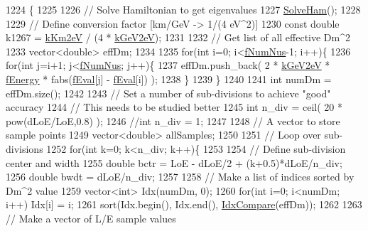 \begin{DoxyCode}
1224 \{
1225 
1226   \textcolor{comment}{// Solve Hamiltonian to get eigenvalues}
1227   \hyperlink{classOscProb_1_1PMNS__Base_a91f065cb9e910e0095e41462b4420b01}{SolveHam}();
1228 
1229   \textcolor{comment}{// Define conversion factor [km/GeV -> 1/(4 eV^2)]}
1230   \textcolor{keyword}{const} \textcolor{keywordtype}{double} k1267 = \hyperlink{classOscProb_1_1PMNS__Base_a382ddd7b76ca89b43f22614a2ea7327b}{kKm2eV} / (4 * \hyperlink{classOscProb_1_1PMNS__Base_ad36a0a6bf58d6ec093d3947784bd89e9}{kGeV2eV});
1231 
1232   \textcolor{comment}{// Get list of all effective Dm^2}
1233   vector<double> effDm;
1234 
1235   \textcolor{keywordflow}{for}(\textcolor{keywordtype}{int} i=0; i<\hyperlink{classOscProb_1_1PMNS__Base_a24bb74bed63569dfe88b18fa6a08060e}{fNumNus}-1; i++)\{
1236     \textcolor{keywordflow}{for}(\textcolor{keywordtype}{int} j=i+1; j<\hyperlink{classOscProb_1_1PMNS__Base_a24bb74bed63569dfe88b18fa6a08060e}{fNumNus}; j++)\{
1237       effDm.push\_back( 2 * \hyperlink{classOscProb_1_1PMNS__Base_ad36a0a6bf58d6ec093d3947784bd89e9}{kGeV2eV} * \hyperlink{classOscProb_1_1PMNS__Base_a2800af6d436972f3e900867790c046b0}{fEnergy} * fabs(\hyperlink{classOscProb_1_1PMNS__Base_a6319c34d7decbb9d7d6da279c06e8c2d}{fEval}[j] - 
      \hyperlink{classOscProb_1_1PMNS__Base_a6319c34d7decbb9d7d6da279c06e8c2d}{fEval}[i]) );
1238     \}
1239   \}
1240 
1241   \textcolor{keywordtype}{int} numDm = effDm.size();
1242 
1243   \textcolor{comment}{// Set a number of sub-divisions to achieve "good" accuracy}
1244   \textcolor{comment}{// This needs to be studied better}
1245   \textcolor{keywordtype}{int} n\_div = ceil( 20 * pow(dLoE/LoE,0.8) );
1246   \textcolor{comment}{//int n\_div = 1;}
1247 
1248   \textcolor{comment}{// A vector to store sample points}
1249   vector<double> allSamples;
1250 
1251   \textcolor{comment}{// Loop over sub-divisions}
1252   \textcolor{keywordflow}{for}(\textcolor{keywordtype}{int} k=0; k<n\_div; k++)\{
1253 
1254     \textcolor{comment}{// Define sub-division center and width}
1255     \textcolor{keywordtype}{double} bctr = LoE - dLoE/2 + (k+0.5)*dLoE/n\_div;
1256     \textcolor{keywordtype}{double} bwdt = dLoE/n\_div;
1257 
1258     \textcolor{comment}{// Make a list of indices sorted by Dm^2 value}
1259     vector<int> Idx(numDm, 0);
1260     \textcolor{keywordflow}{for}(\textcolor{keywordtype}{int} i=0; i<numDm; i++) Idx[i] = i;
1261     sort(Idx.begin(), Idx.end(), \hyperlink{structOscProb_1_1IdxCompare}{IdxCompare}(effDm));
1262 
1263     \textcolor{comment}{// Make a vector of L/E sample values}

\end{DoxyCode}

